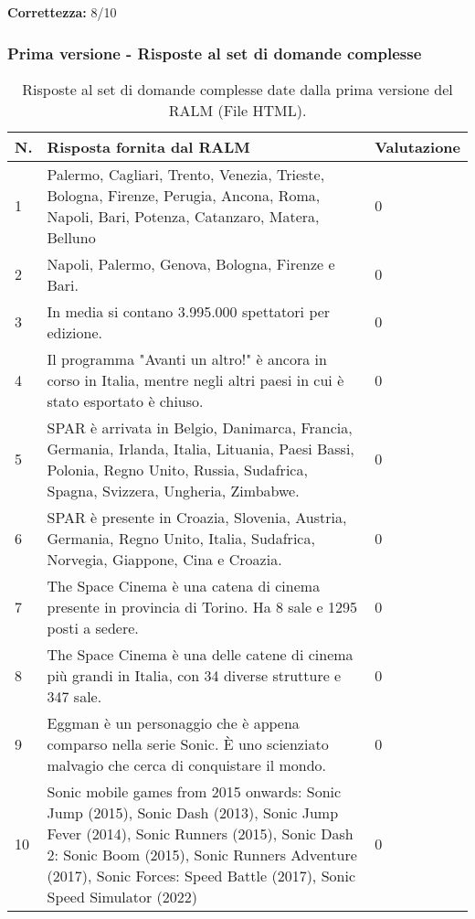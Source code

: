 \textbf{Correttezza:} 8/10

\subsubsection{Prima versione - Risposte al set di domande complesse}

\begin{table}[H]
    \centering
    \begin{tabular}{|p{0.5cm} |p{6cm} |p{2cm}|}
        \hline
        \textbf{N}. & \textbf{Risposta fornita dal RALM} & \textbf{Valutazione} \\
        \hline
        1 & Palermo, Cagliari, Trento, Venezia, Trieste, Bologna, Firenze, Perugia, Ancona, Roma, Napoli, Bari, Potenza, Catanzaro, Matera, Belluno & 0 \\
        \hline
        2 & Napoli, Palermo, Genova, Bologna, Firenze e Bari. & 0 \\
        \hline
        3 & In media si contano 3.995.000 spettatori per edizione. & 0 \\
        \hline
        4 & Il programma "Avanti un altro!" è ancora in corso in Italia, mentre negli altri paesi in cui è stato esportato è chiuso. & 0 \\
        \hline
        5 & SPAR è arrivata in Belgio, Danimarca, Francia, Germania, Irlanda, Italia, Lituania, Paesi Bassi, Polonia, Regno Unito, Russia, Sudafrica, Spagna, Svizzera, Ungheria, Zimbabwe. & 0 \\
        \hline
        6 & SPAR è presente in Croazia, Slovenia, Austria, Germania, Regno Unito, Italia, Sudafrica, Norvegia, Giappone, Cina e Croazia. & 0 \\
        \hline
        7 & The Space Cinema è una catena di cinema presente in provincia di Torino. Ha 8 sale e 1295 posti a sedere. & 0 \\
        \hline
        8 & The Space Cinema è una delle catene di cinema più grandi in Italia, con 34 diverse strutture e 347 sale.  & 0 \\
        \hline
        9 & Eggman è un personaggio che è appena comparso nella serie Sonic. È uno scienziato malvagio che cerca di conquistare il mondo. & 0 \\
        \hline
        10 & Sonic mobile games from 2015 onwards: Sonic Jump (2015), Sonic Dash (2013), Sonic Jump Fever (2014), Sonic Runners (2015), Sonic Dash 2: Sonic Boom (2015), Sonic Runners Adventure (2017), Sonic Forces: Speed Battle (2017), Sonic Speed Simulator (2022) & 0 \\
        \hline
    \end{tabular}
    \caption{Risposte al set di domande complesse date dalla prima versione del RALM (File HTML).}
\end{table}

